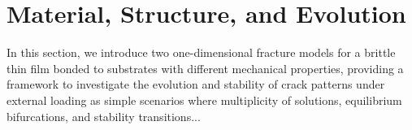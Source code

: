 \section{Material, Structure, and Evolution}

In this section, we introduce two one-dimensional fracture models for a brittle thin film bonded to substrates with different mechanical properties, providing a framework to investigate the evolution and stability of crack patterns under external loading as simple scenarios where multiplicity of solutions, equilibrium bifurcations, and stability transitions...

\newcommand{\Estiff}{\Psi}
\newcommand{\Ecompl}{\widetilde\Psi}
\newcommand{\subsu}{v}
\newcommand{\homogdiss}{\mathsf{w}}
\newcommand{\soften}{\mathsf{a}}
\newcommand{\damagell}{\ell}
\newcommand{\elastell}{\Lambda}
\newcommand{\stiffratio}{\rho}

